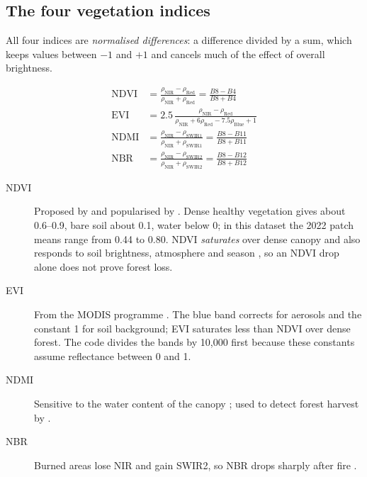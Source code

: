 \subsection{The four vegetation indices}

All four indices are \emph{normalised differences}: a difference divided by a sum, which keeps values between $-1$ and $+1$ and cancels much of the effect of overall brightness.

\begin{align}
\mathrm{NDVI} &= \frac{\rho_{\mathrm{NIR}} - \rho_{\mathrm{Red}}}{\rho_{\mathrm{NIR}} + \rho_{\mathrm{Red}}} = \frac{B8 - B4}{B8 + B4} \label{eq:ndvi}\\[3pt]
\mathrm{EVI} &= 2.5\,\frac{\rho_{\mathrm{NIR}} - \rho_{\mathrm{Red}}}{\rho_{\mathrm{NIR}} + 6\rho_{\mathrm{Red}} - 7.5\rho_{\mathrm{Blue}} + 1} \label{eq:evi}\\[3pt]
\mathrm{NDMI} &= \frac{\rho_{\mathrm{NIR}} - \rho_{\mathrm{SWIR1}}}{\rho_{\mathrm{NIR}} + \rho_{\mathrm{SWIR1}}} = \frac{B8 - B11}{B8 + B11} \label{eq:ndmi}\\[3pt]
\mathrm{NBR} &= \frac{\rho_{\mathrm{NIR}} - \rho_{\mathrm{SWIR2}}}{\rho_{\mathrm{NIR}} + \rho_{\mathrm{SWIR2}}} = \frac{B8 - B12}{B8 + B12} \label{eq:nbr}
\end{align}

\begin{description}
  \item[NDVI] Proposed by \citet{rouse1974} and popularised by \citet{tucker1979}. Dense healthy vegetation gives about 0.6--0.9, bare soil about 0.1, water below 0; in this dataset the 2022 patch means range from 0.44 to 0.80. NDVI \emph{saturates} over dense canopy and also responds to soil brightness, atmosphere and season \citep{huete2002}, so an NDVI drop alone does not prove forest loss.
  \item[EVI] From the MODIS programme \citep{huete2002}. The blue band corrects for aerosols and the constant 1 for soil background; EVI saturates less than NDVI over dense forest. The code divides the bands by 10,000 first because these constants assume reflectance between 0 and 1.
  \item[NDMI] Sensitive to the water content of the canopy \citep{gao1996}; used to detect forest harvest by \citet{wilsonsader2002}.
  \item[NBR] Burned areas lose NIR and gain SWIR2, so NBR drops sharply after fire \citep{keybenson2006}.
\end{description}

